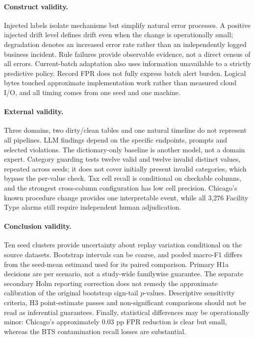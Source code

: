 \paragraph{Construct validity.} Injected labels isolate mechanisms but simplify natural error processes. A positive injected drift level defines drift even when the change is operationally small; degradation denotes an increased error rate rather than an independently logged business incident. Rule failures provide observable evidence, not a direct census of all errors. Current-batch adaptation also uses information unavailable to a strictly predictive policy. Record FPR does not fully express batch alert burden. Logical bytes touched approximate implementation work rather than measured cloud I/O, and all timing comes from one seed and one machine.

\paragraph{External validity.} Three domains, two dirty/clean tables and one natural timeline do not represent all pipelines. LLM findings depend on the specific endpoints, prompts and selected violations. The dictionary-only baseline is another model, not a domain expert. Category guarding tests twelve valid and twelve invalid distinct values, repeated across seeds; it does not cover initially present invalid categories, which bypass the per-value check. Tax cell recall is conditional on checkable columns, and the strongest cross-column configuration has low cell precision. Chicago's known procedure change provides one interpretable event, while all 3,276 Facility Type alarms still require independent human adjudication.

\paragraph{Conclusion validity.} Ten seed clusters provide uncertainty about replay variation conditional on the source datasets. Bootstrap intervals can be coarse, and pooled macro-F1 differs from the seed-mean estimand used for its paired comparison. Primary H1a decisions are per scenario, not a study-wide familywise guarantee. The separate secondary Holm reporting correction does not remedy the approximate calibration of the original bootstrap sign-tail $p$-values. Descriptive sensitivity criteria, H3 point-estimate passes and non-significant comparisons should not be read as inferential guarantees. Finally, statistical differences may be operationally minor: Chicago's approximately 0.03 pp FPR reduction is clear but small, whereas the BTS contamination recall losses are substantial.
